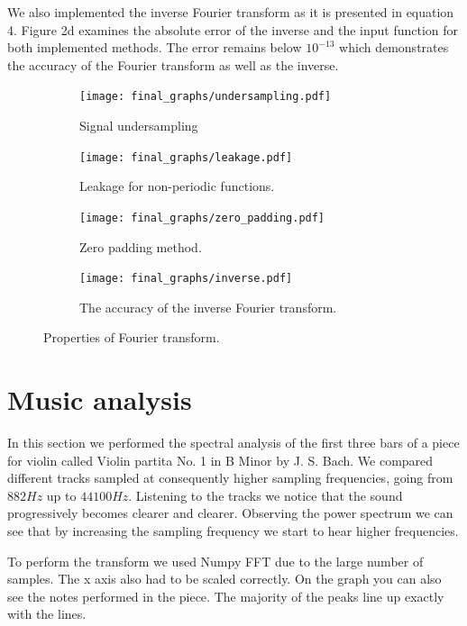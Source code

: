 \documentclass[12pt, a4paper]{article}
\begin{document}
We also implemented the inverse Fourier transform as it is presented in equation 4. Figure 2d examines the absolute error of the inverse and the input function for both implemented methods. The error remains below $10^{-13}$ which demonstrates the accuracy of the Fourier transform as well as the inverse.

\begin{figure}[hbtp]
  \begin{subfigure}{0.5\textwidth}
  \texttt{[image: final\_graphs/undersampling.pdf]}
  \caption{Signal undersampling} \label{fig:a}
  \end{subfigure}
  \hspace*{\fill}
  \begin{subfigure}{0.5\textwidth}
  \texttt{[image: final\_graphs/leakage.pdf]}
  \caption{Leakage for non-periodic functions.} \label{fig:b}
  \end{subfigure}
  \medskip
  \begin{subfigure}{0.5\textwidth}
  \texttt{[image: final\_graphs/zero\_padding.pdf]}
  \caption{Zero padding method.} \label{fig:c}
  \end{subfigure}
  \hspace*{\fill}
  \begin{subfigure}{0.5\textwidth}
  \texttt{[image: final\_graphs/inverse.pdf]}
  \caption{The accuracy of the inverse Fourier transform.} \label{fig:d}
  \end{subfigure} 
  \caption{Properties of Fourier transform.} \label{fig:1}
\end{figure}

\section{Music analysis}

In this section we performed the spectral analysis of the first three bars of a piece for violin called Violin partita No. 1 in B Minor by J. S. Bach. We compared different tracks sampled at consequently higher sampling frequencies, going from $882 Hz$ up to $44100 Hz$. Listening to the tracks we notice that the sound progressively becomes clearer and clearer. Observing the power spectrum we can see that by increasing the sampling frequency we start to hear higher frequencies.

To perform the transform we used Numpy FFT due to the large number of samples. The x axis also had to be scaled correctly. On the graph you can also see the notes performed in the piece. The majority of the peaks line up exactly with the lines.
\end{document}
